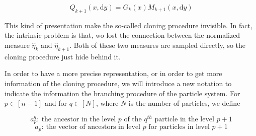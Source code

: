 \documentclass[a4paper,10pt]{article}
\begin{document}
\begin{equation}
                \label{FK_classic}
Q_{k+1}(x,\mathrm{d}y) = G_k(x)M_{k+1}(x,\mathrm{d}y)
\end{equation}

This kind of presentation make the so-called cloning procedure invisible.
In fact, the intrinsic problem is that, wo lost the connection between the normalized measure
$\hat\eta_k$ and $\hat \eta_{k+1}$. Both of these two measures are sampled
directly, so the cloning procedure just hide behind it.

In order to have a more precise representation, or in order to get more
information of the cloning procedure, we will introduce a new
notation to indicate the information the branching procedure of
the particle system.
For $p \in [n-1]$ and for $q \in [N]$, where $N$ is the number of particles, we
define

$$
a_p^q:\ \text{the ancestor in the level $p$ of the $q^{th}$ particle in the
level $p+1$}
$$
$$
a_p:\ \text{the vector of ancestors in level $p$ for particles in level $p+1$}
$$





\end{document}
